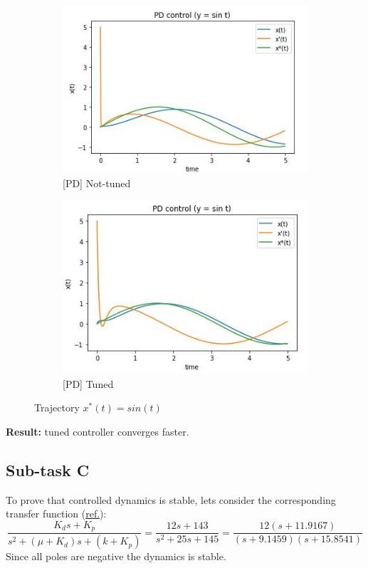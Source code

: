 \documentclass[12pt,letterpaper]{article}
\begin{document}
    \begin{figure}[htb]
        \begin{subfigure}{.5\textwidth}
            \centering
            \includegraphics[width=1\linewidth]{images/output/300_150_0-sin.jpg}
            \caption{[PD] Not-tuned}
        \end{subfigure}
        \begin{subfigure}{.5\textwidth}
          \centering
          \includegraphics[width=1\linewidth]{images/output/143_12_0-sin.jpg}
          \caption{[PD] Tuned}
        \end{subfigure}
    \caption{Trajectory $x^*(t) = sin(t)$}
    \label{fig:PD_sin}
    \end{figure}
\newpage    
    \textbf{Result: } tuned controller converges faster.

\subsection*{Sub-task C}
    To prove that controlled dynamics is stable, lets consider the corresponding transfer function (\href{http://ctms.engin.umich.edu/CTMS/index.php?example=Introduction&section=ControlPID#16}{ref.}):
    \begin{equation*}
        \frac{K_d s + K_p}{s^2 + (\mu + K_d)s + (k + K_p)} = \frac{12 s + 143}{s^2 + 25s + 145} = \frac{12(s + 11.9167)}{(s + 9.1459)(s + 15.8541)}
    \end{equation*}
    Since all poles are negative the dynamics is stable.
\end{document}

